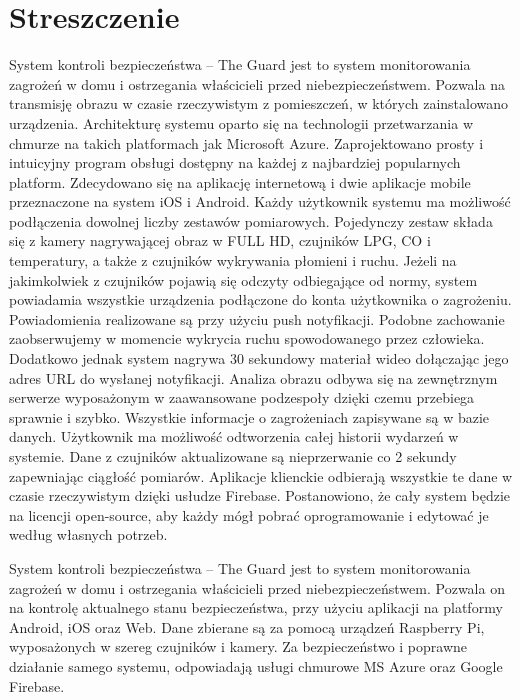 \chapter{Streszczenie}

System kontroli bezpieczeństwa – The Guard jest to system monitorowania zagrożeń w domu i ostrzegania właścicieli przed niebezpieczeństwem. Pozwala na transmisję obrazu w czasie rzeczywistym z pomieszczeń, w których zainstalowano urządzenia. Architekturę systemu oparto się na technologii przetwarzania w chmurze na takich platformach jak Microsoft Azure. Zaprojektowano prosty i intuicyjny program obsługi dostępny na każdej z najbardziej popularnych platform. Zdecydowano się na aplikację internetową i dwie aplikacje mobile przeznaczone na system iOS i Android. Każdy użytkownik systemu ma możliwość podłączenia dowolnej liczby zestawów pomiarowych. Pojedynczy zestaw składa się z kamery nagrywającej obraz w FULL HD, czujników LPG, CO i temperatury, a także z czujników wykrywania płomieni i ruchu. Jeżeli na jakimkolwiek z czujników pojawią się odczyty odbiegające od normy, system powiadamia wszystkie urządzenia podłączone do konta użytkownika o zagrożeniu. Powiadomienia realizowane są przy użyciu push notyfikacji. 
Podobne zachowanie zaobserwujemy w momencie wykrycia ruchu spowodowanego przez człowieka. Dodatkowo jednak system nagrywa 30 sekundowy materiał wideo dołączając jego adres URL do wysłanej notyfikacji. Analiza obrazu odbywa się na zewnętrznym serwerze wyposażonym w zaawansowane podzespoły dzięki czemu przebiega sprawnie i szybko. Wszystkie informacje o zagrożeniach zapisywane są w bazie danych. Użytkownik ma możliwość odtworzenia całej historii wydarzeń w systemie. Dane z czujników aktualizowane są nieprzerwanie co 2 sekundy zapewniając ciągłość pomiarów. Aplikacje klienckie odbierają wszystkie te dane w czasie rzeczywistym dzięki usłudze Firebase. Postanowiono, że cały system będzie na licencji open-source, aby każdy mógł pobrać oprogramowanie i edytować je według własnych potrzeb.




System kontroli bezpieczeństwa – The Guard jest to system monitorowania zagrożeń w domu i ostrzegania właścicieli przed niebezpieczeństwem. Pozwala on na kontrolę aktualnego stanu bezpieczeństwa, przy użyciu aplikacji na platformy Android, iOS oraz Web. Dane zbierane są za pomocą urządzeń Raspberry Pi, wyposażonych w szereg czujników i kamery. Za bezpieczeństwo i poprawne działanie samego systemu, odpowiadają usługi chmurowe MS Azure oraz Google Firebase. 



